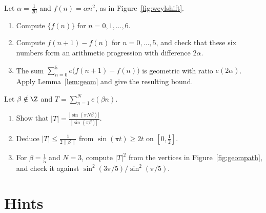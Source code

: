 \begin{exercise}[$\star\star$]\label{ex:shift20}
Let $\alpha=\frac1{20}$ and $f(n)=\alpha n^2$, as in Figure~\ref{fig:weylshift}.
\begin{enumerate}[label=(\alph*)]
\item Compute $\{f(n)\}$ for $n=0,1,\dots,6$.
\item Compute $f(n+1)-f(n)$ for $n=0,\dots,5$, and check that these six numbers form an arithmetic progression with difference $2\alpha$.
\item The sum $\sum_{n=0}^{5}e\bigl(f(n+1)-f(n)\bigr)$ is geometric with ratio $e(2\alpha)$. Apply Lemma~\ref{lem:geom} and give the resulting bound.
\end{enumerate}
\end{exercise}

\begin{exercise}[$\star\star\star$]\label{ex:squaresum}
Let $\beta\notin\Z$ and $T=\sum_{n=1}^N e(\beta n)$.
\begin{enumerate}[label=(\alph*)]
\item Show that $|T|=\frac{|\sin(\pi N\beta)|}{|\sin(\pi\beta)|}$.
\item Deduce $|T|\le\frac1{2\|\beta\|}$ from $\sin(\pi t)\ge2t$ on $[0,\frac12]$.
\item For $\beta=\frac15$ and $N=3$, compute $|T|^2$ from the vertices in Figure~\ref{fig:geompath}, and check it against $\sin^2(3\pi/5)/\sin^2(\pi/5)$.
\end{enumerate}
\end{exercise}

\section{Hints}

